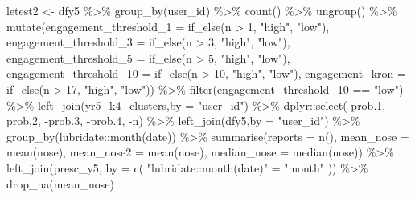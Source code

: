 \documentclass[
]{article}
\newenvironment{Shaded}{\begin{snugshade}}{\end{snugshade}}
\newcommand{\AttributeTok}[1]{\textcolor[rgb]{0.77,0.63,0.00}{#1}}
\newcommand{\DecValTok}[1]{\textcolor[rgb]{0.00,0.00,0.81}{#1}}
\newcommand{\FloatTok}[1]{\textcolor[rgb]{0.00,0.00,0.81}{#1}}
\newcommand{\FunctionTok}[1]{\textcolor[rgb]{0.00,0.00,0.00}{#1}}
\newcommand{\NormalTok}[1]{#1}
\newcommand{\OtherTok}[1]{\textcolor[rgb]{0.56,0.35,0.01}{#1}}
\newcommand{\SpecialCharTok}[1]{\textcolor[rgb]{0.00,0.00,0.00}{#1}}
\newcommand{\StringTok}[1]{\textcolor[rgb]{0.31,0.60,0.02}{#1}}
\begin{document}
\begin{Shaded}
\begin{Highlighting}[]
 
\NormalTok{ letest2 }\OtherTok{\textless{}{-}}\NormalTok{  dfy5 }\SpecialCharTok{\%\textgreater{}\%}
   \FunctionTok{group\_by}\NormalTok{(user\_id) }\SpecialCharTok{\%\textgreater{}\%}
   \FunctionTok{count}\NormalTok{() }\SpecialCharTok{\%\textgreater{}\%}
   \FunctionTok{ungroup}\NormalTok{() }\SpecialCharTok{\%\textgreater{}\%} 
   \FunctionTok{mutate}\NormalTok{(}\AttributeTok{engagement\_threshold\_1 =} \FunctionTok{if\_else}\NormalTok{(n }\SpecialCharTok{\textgreater{}} \DecValTok{1}\NormalTok{, }\StringTok{"high"}\NormalTok{, }\StringTok{"low"}\NormalTok{),}
          \AttributeTok{engagement\_threshold\_3 =} \FunctionTok{if\_else}\NormalTok{(n }\SpecialCharTok{\textgreater{}} \DecValTok{3}\NormalTok{, }\StringTok{"high"}\NormalTok{, }\StringTok{"low"}\NormalTok{),}
          \AttributeTok{engagement\_threshold\_5 =} \FunctionTok{if\_else}\NormalTok{(n }\SpecialCharTok{\textgreater{}} \DecValTok{5}\NormalTok{, }\StringTok{"high"}\NormalTok{, }\StringTok{"low"}\NormalTok{),}
          \AttributeTok{engagement\_threshold\_10 =} \FunctionTok{if\_else}\NormalTok{(n }\SpecialCharTok{\textgreater{}} \DecValTok{10}\NormalTok{, }\StringTok{"high"}\NormalTok{, }\StringTok{"low"}\NormalTok{),}
          \AttributeTok{engagement\_kron =} \FunctionTok{if\_else}\NormalTok{(n }\SpecialCharTok{\textgreater{}} \DecValTok{17}\NormalTok{, }\StringTok{"high"}\NormalTok{, }\StringTok{"low"}\NormalTok{)) }\SpecialCharTok{\%\textgreater{}\%} 
   \FunctionTok{filter}\NormalTok{(engagement\_threshold\_10 }\SpecialCharTok{==} \StringTok{"low"}\NormalTok{) }\SpecialCharTok{\%\textgreater{}\%} 
   \FunctionTok{left\_join}\NormalTok{(yr5\_k4\_clusters,}\AttributeTok{by =} \StringTok{"user\_id"}\NormalTok{) }\SpecialCharTok{\%\textgreater{}\%} 
\NormalTok{   dplyr}\SpecialCharTok{::}\FunctionTok{select}\NormalTok{(}\SpecialCharTok{{-}}\NormalTok{prob}\FloatTok{.1}\NormalTok{,}
                 \SpecialCharTok{{-}}\NormalTok{prob}\FloatTok{.2}\NormalTok{,}
                 \SpecialCharTok{{-}}\NormalTok{prob}\FloatTok{.3}\NormalTok{,}
                 \SpecialCharTok{{-}}\NormalTok{prob}\FloatTok{.4}\NormalTok{,}
                 \SpecialCharTok{{-}}\NormalTok{n) }\SpecialCharTok{\%\textgreater{}\%} 
   \FunctionTok{left\_join}\NormalTok{(dfy5,}\AttributeTok{by =} \StringTok{"user\_id"}\NormalTok{) }\SpecialCharTok{\%\textgreater{}\%}  
   \FunctionTok{group\_by}\NormalTok{(lubridate}\SpecialCharTok{::}\FunctionTok{month}\NormalTok{(date)) }\SpecialCharTok{\%\textgreater{}\%}
   \FunctionTok{summarise}\NormalTok{(}\AttributeTok{reports =} \FunctionTok{n}\NormalTok{(),}
             \AttributeTok{mean\_nose =} \FunctionTok{mean}\NormalTok{(nose),}
             \AttributeTok{mean\_nose2 =} \FunctionTok{mean}\NormalTok{(nose),}
             \AttributeTok{median\_nose =} \FunctionTok{median}\NormalTok{(nose)) }\SpecialCharTok{\%\textgreater{}\%}
   \FunctionTok{left\_join}\NormalTok{(presc\_y5, }\AttributeTok{by =} \FunctionTok{c}\NormalTok{( }\StringTok{"lubridate::month(date)"} \OtherTok{=} \StringTok{"month"}\NormalTok{ )) }\SpecialCharTok{\%\textgreater{}\%} 
   \FunctionTok{drop\_na}\NormalTok{(mean\_nose) }
 

\end{Highlighting}
\end{Shaded}
\end{document}
